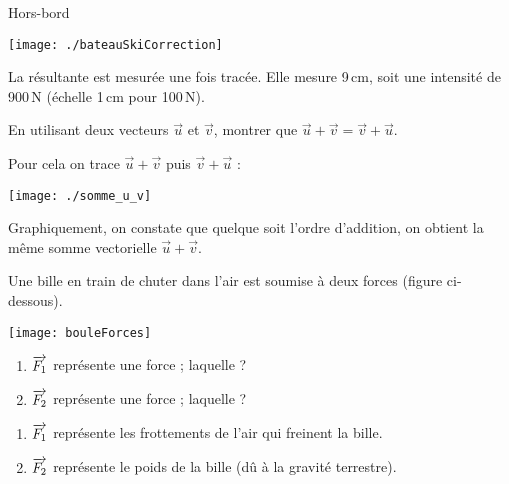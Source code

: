 \begin{corrige}
Hors-bord

\begin{center}
    \texttt{[image: ./bateauSkiCorrection]}   
\end{center}

La résultante est mesurée une fois tracée. Elle mesure 9\,cm, soit une intensité de 900\,N (échelle 1\,cm pour 100\,N).    
\end{corrige}





\begin{exercice}
En utilisant deux vecteurs $\vec{u}$ et $\vec{v}$, montrer que $\vec{u} + \vec{v} = \vec{v} + \vec{u}$.
\end{exercice}


\begin{corrige}
Pour cela on trace $\vec{u} + \vec{v}$ puis $\vec{v} + \vec{u}$ :

\vspace{1em}
\begin{center}
    \texttt{[image: ./somme\_u\_v]}   
\end{center}

Graphiquement, on constate que quelque soit l'ordre d'addition, on obtient la même somme vectorielle $\vec{u} + \vec{v}$.
\end{corrige}



\begin{exercice}
Une bille en train de chuter dans l'air est soumise à deux forces (figure ci-dessous).
\vspace{1em}
\begin{center}
    \texttt{[image: bouleForces]}   
\end{center}
%
\begin{enumerate}
\item $\overrightarrow{F_1}$ représente une force ; laquelle ?
\item $\overrightarrow{F_2}$ représente une force ; laquelle ?
\end{enumerate}

\end{exercice}

\begin{corrige}
\begin{enumerate}
\item $\overrightarrow{F_1}$ représente les frottements de l'air qui freinent la bille.
\item $\overrightarrow{F_2}$ représente le poids de la bille (dû à la gravité terrestre).
\end{enumerate}
\end{corrige}







